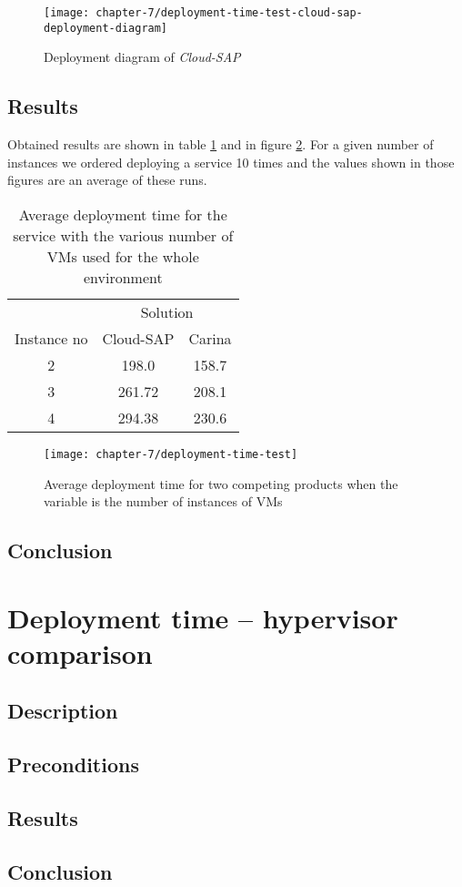 \begin{figure}[!ht]
  \begin{center}
    \texttt{[image: chapter-7/deployment-time-test-cloud-sap-deployment-diagram]}
  \end{center}
  \caption{Deployment diagram of \emph{Cloud-SAP}}
  \label{ch7:deployment-time-test-cloud-sap-deployment-diagram}
\end{figure}

\subsection*{Results}
Obtained results are shown in table \ref{tbl:test-service-deployment-time} and in figure \ref{ch7:deployment-time-test}. For a given number of instances we ordered deploying a service 10 times and the values shown in those figures are an average of these runs.

\begin{table}
  \centering
  \begin{tabular}{ c  c  c }
    \hline
    & \multicolumn{2}{c}{Solution} \\
    \cline{2-3}
    Instance no & Cloud-SAP & Carina \\
    \hline
    2 & 198.0 & 158.7 \\
    3 & 261.72 & 208.1 \\
    4 & 294.38 & 230.6 \\
    \hline
  \end{tabular}
  \caption{Average deployment time for the service with the various number of VMs used for the whole environment}
  \label{tbl:test-service-deployment-time}
\end{table}

\begin{figure}[!ht]
  \begin{center}
    \texttt{[image: chapter-7/deployment-time-test]}
  \end{center}
  \caption{Average deployment time for two competing products when the variable is the number of instances of VMs}
  \label{ch7:deployment-time-test}
\end{figure}

\subsection*{Conclusion}


\section{Deployment time -- hypervisor comparison}
\subsection*{Description}
\subsection*{Preconditions}
\subsection*{Results}
\subsection*{Conclusion}

